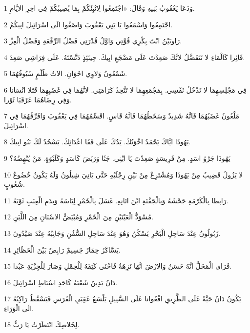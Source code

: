 \par 1 وَدَعَا يَعْقُوبُ بَنِيهِ وَقَالَ: «اجْتَمِعُوا لِانْبِئَكُمْ بِمَا يُصِيبُكُمْ فِي اخِرِ الايَّامِ.
\par 2 اجْتَمِعُوا وَاسْمَعُوا يَا بَنِي يَعْقُوبَ وَاصْغُوا الَى اسْرَائِيلَ ابِيكُمْ.
\par 3 رَاوبَيْنُ انْتَ بِكْرِي قُوَّتِي وَاوَّلُ قُدْرَتِي فَضْلُ الرِّفْعَةِ وَفَضْلُ الْعِزِّ.
\par 4 فَائِرا كَالْمَاءِ لا تَتَفَضَّلُ لانَّكَ صَعِدْتَ عَلَى مَضْجَعِ ابِيكَ. حِينَئِذٍ دَنَّسْتَهُ. عَلَى فِرَاشِي صَعِدَ.
\par 5 شَمْعُونُ وَلاوِي اخَوَانِ. الاتُ ظُلْمٍ سُيُوفُهُمَا.
\par 6 فِي مَجْلِسِهِمَا لا تَدْخُلُ نَفْسِي. بِمَجْمَعِهِمَا لا تَتَّحِدُ كَرَامَتِي. لانَّهُمَا فِي غَضَبِهِمَا قَتَلا انْسَانا وَفِي رِضَاهُمَا عَرْقَبَا ثَوْرا.
\par 7 مَلْعُونٌ غَضَبُهُمَا فَانَّهُ شَدِيدٌ وَسَخَطُهُمَا فَانَّهُ قَاسٍ. اقَسِّمُهُمَا فِي يَعْقُوبَ وَافَرِّقُهُمَا فِي اسْرَائِيلَ.
\par 8 يَهُوذَا ايَّاكَ يَحْمَدُ اخْوَتُكَ. يَدُكَ عَلَى قَفَا اعْدَائِكَ. يَسْجُدُ لَكَ بَنُو ابِيكَ.
\par 9 يَهُوذَا جَرْوُ اسَدٍ. مِنْ فَرِيسَةٍ صَعِدْتَ يَا ابْنِي. جَثَا وَرَبَضَ كَاسَدٍ وَكَلَبْوَةٍ. مَنْ يُنْهِضُهُ؟
\par 10 لا يَزُولُ قَضِيبٌ مِنْ يَهُوذَا وَمُشْتَرِعٌ مِنْ بَيْنِ رِجْلَيْهِ حَتَّى يَاتِيَ شِيلُونُ وَلَهُ يَكُونُ خُضُوعُ شُعُوبٍ.
\par 11 رَابِطا بِالْكَرْمَةِ جَحْشَهُ وَبِالْجَفْنَةِ ابْنَ اتَانِهِ. غَسَلَ بِالْخَمْرِ لِبَاسَهُ وَبِدَمِ الْعِنَبِ ثَوْبَهُ.
\par 12 مُسْوَدُّ الْعَيْنَيْنِ مِنَ الْخَمْرِ وَمُبْيَضُّ الاسْنَانِ مِنَ اللَّبَنِ.
\par 13 زَبُولُونُ عِنْدَ سَاحِلِ الْبَحْرِ يَسْكُنُ وَهُوَ عِنْدَ سَاحِلِ السُّفُنِ وَجَانِبُهُ عِنْدَ صَيْدُونَ.
\par 14 يَسَّاكَرُ حِمَارٌ جَسِيمٌ رَابِضٌ بَيْنَ الْحَظَائِرِ.
\par 15 فَرَاى الْمَحَلَّ انَّهُ حَسَنٌ وَالارْضَ انَّهَا نَزِهَةٌ فَاحْنَى كَتِفَهُ لِلْحِمْلِ وَصَارَ لِلْجِزْيَةِ عَبْدا.
\par 16 دَانُ يَدِينُ شَعْبَهُ كَاحَدِ اسْبَاطِ اسْرَائِيلَ.
\par 17 يَكُونُ دَانُ حَيَّةً عَلَى الطَّرِيقِ افْعُوانا عَلَى السَّبِيلِ يَلْسَعُ عَقِبَيِ الْفَرَسِ فَيَسْقُطُ رَاكِبُهُ الَى الْوَرَاءِ.
\par 18 لِخَلاصِكَ انْتَظَرْتُ يَا رَبُّ.
